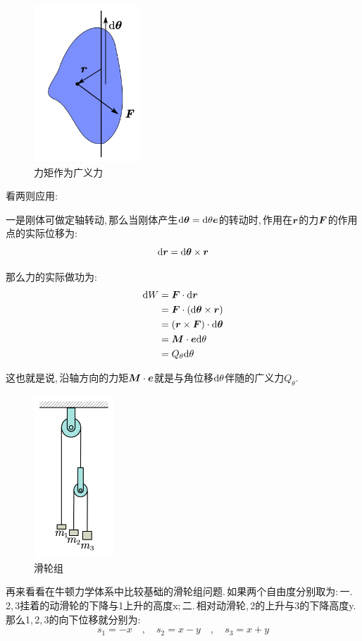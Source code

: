 \begin{figure}
\centering
\includegraphics[width=4cm]{image/6-2-5.png}
\caption{力矩作为广义力}
\end{figure}
看两则应用:

一是刚体可做定轴转动,\,那么当刚体产生$\textrm{d} \boldsymbol{\theta}=\textrm{d} \theta \boldsymbol{e}$的转动时,\,作用在$\boldsymbol{r}$的力$\boldsymbol{F}$的作用点的实际位移为:
\[\textrm{d} \boldsymbol{r}=\textrm{d} \boldsymbol{\theta}\times \boldsymbol{r}\]

那么力的实际做功为:
\begin{align*}
\textrm{d} W  &=\boldsymbol{F}\cdot \textrm{d} \boldsymbol{r}\\
		    &=\boldsymbol{F}\cdot(\textrm{d} \boldsymbol{\theta}\times \boldsymbol{r})\\
			&=(\boldsymbol{r}\times\boldsymbol{F})\cdot\textrm{d} \boldsymbol{\theta}\\
			&=\boldsymbol{M}\cdot \boldsymbol{e}\textrm{d} \theta\\
			&=Q_\theta \textrm{d} \theta
\end{align*}

这也就是说,\,沿轴方向的力矩$\boldsymbol{M}\cdot \boldsymbol{e}$就是与角位移$\textrm{d} \theta$伴随的广义力$Q_\theta$.

\begin{figure}
\centering
\includegraphics[width=3cm]{image/6-2-7.png}
\caption{滑轮组}
\end{figure}
再来看看在牛顿力学体系中比较基础的滑轮组问题.\,如果两个自由度分别取为:\,一.\,2,\,3挂着的动滑轮的下降与1上升的高度x;\,二.\,相对动滑轮,\,2的上升与3的下降高度y.\,那么1,\,2,\,3的向下位移就分别为:
\[s_1=-x\quad,\quad s_2=x-y\quad,\quad s_3=x+y\]

